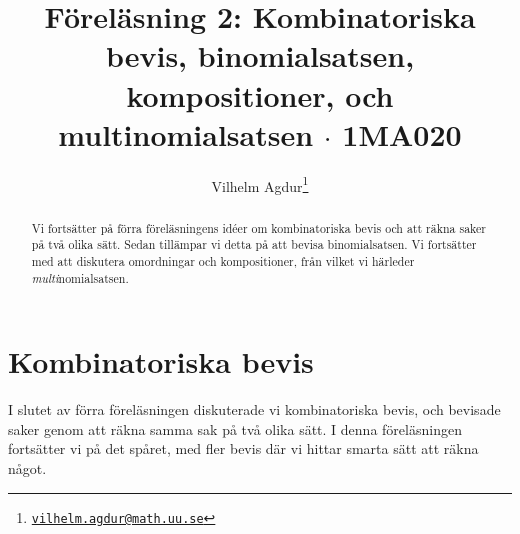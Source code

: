 \documentclass[nobib]{tufte-handout}
\title{Föreläsning 2: Kombinatoriska bevis, binomialsatsen, kompositioner, och multinomialsatsen $\cdot$ 1MA020}
\author[Vilhelm Agdur]{Vilhelm Agdur\thanks{\href{mailto:vilhelm.agdur@math.uu.se}{\nolinkurl{vilhelm.agdur@math.uu.se}}}}
\begin{document}
\maketitle%

\begin{abstract}
\noindent
Vi fortsätter på förra föreläsningens idéer om kombinatoriska bevis och att räkna saker på två olika sätt. Sedan tillämpar vi detta på att bevisa binomialsatsen. Vi fortsätter med att diskutera omordningar och kompositioner, från vilket vi härleder \emph{multi}nomialsatsen.
\end{abstract}

\section{Kombinatoriska bevis}

I slutet av förra föreläsningen diskuterade vi kombinatoriska bevis, och bevisade saker genom att räkna samma sak på två olika sätt. I denna föreläsningen fortsätter vi på det spåret, med fler bevis där vi hittar smarta sätt att räkna något.
\end{document}
